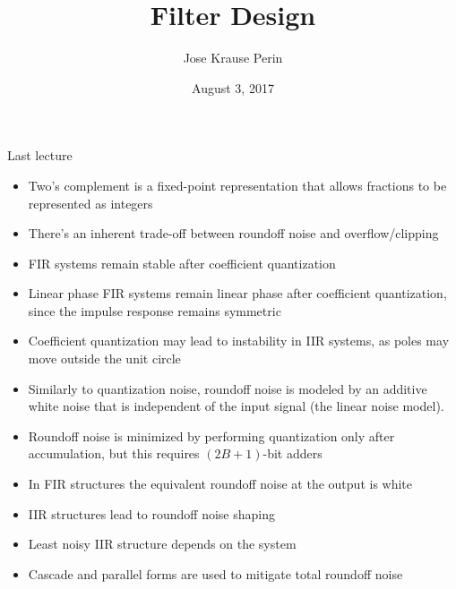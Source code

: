 \documentclass[10pt]{beamer}
\title[EE 264]{Filter Design}
\author{Jose Krause Perin}
\institute{Stanford University}
\date{August 3, 2017}
\begin{document}
\begin{frame}
  \titlepage
\end{frame}

%

%
\begin{frame}{Last lecture}
\begin{itemize}
	\item Two's complement is a fixed-point representation that allows fractions to be represented as integers
	\item There's an inherent trade-off between roundoff noise and overflow/clipping
	\item FIR systems remain stable after coefficient quantization
	\item Linear phase FIR systems remain linear phase after coefficient quantization, since the impulse response remains symmetric
	\item Coefficient quantization may lead to instability in IIR systems, as poles may move outside the unit circle
	\item Similarly to quantization noise, roundoff noise is modeled by an additive white noise that is independent of the input signal (the linear noise model).
	\item Roundoff noise is minimized by performing quantization only after accumulation, but this requires $(2B+1)$-bit adders
	\item In FIR structures the equivalent roundoff noise at the output is white
	\item IIR structures lead to roundoff noise shaping
	\item Least noisy IIR structure depends on the system
	\item Cascade and parallel forms are used to mitigate total roundoff noise
\end{itemize}
\end{frame}
\end{document}
